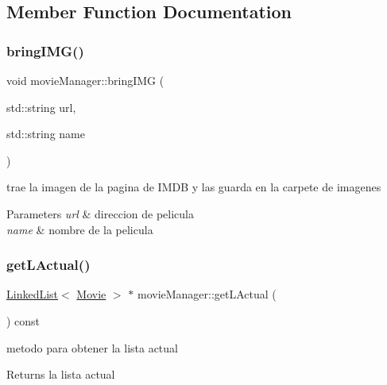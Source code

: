 \subsection{Member Function Documentation}
\mbox{\label{classmovieManager_a8cb457bede5df92164c3908b2905caf6}} 
\subsubsection{\texorpdfstring{bring\+I\+M\+G()}{bringIMG()}}
{\footnotesize\ttfamily void movie\+Manager\+::bring\+I\+MG (\begin{DoxyParamCaption}\item[{std\+::string}]{url,  }\item[{std\+::string}]{name }\end{DoxyParamCaption})}



trae la imagen de la pagina de I\+M\+DB y las guarda en la carpete de imagenes 


\begin{DoxyParams}{Parameters}
{\em url} & direccion de pelicula \\
\hline
{\em name} & nombre de la pelicula \\
\hline
\end{DoxyParams}
\mbox{\label{classmovieManager_a44bc51d4c17f68a40ed227fefbafff06}} 
\subsubsection{\texorpdfstring{get\+L\+Actual()}{getLActual()}}
{\footnotesize\ttfamily \hyperlink{classLinkedList}{Linked\+List}$<$ \hyperlink{classMovie}{Movie} $>$ $\ast$ movie\+Manager\+::get\+L\+Actual (\begin{DoxyParamCaption}{ }\end{DoxyParamCaption}) const}



metodo para obtener la lista actual 

\begin{DoxyReturn}{Returns}
la lista actual 
\end{DoxyReturn}
\mbox{\label{classmovieManager_a3e5c3fa6d602f2f28459c9c7edf723a3}} 
